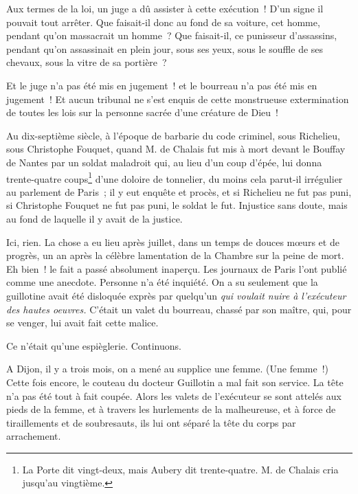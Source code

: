 \documentclass[french,twoside]{book} %
\begin{document}
Aux termes de la loi, un juge a dû assister à cette  exécution ! D’un signe il pouvait tout arrêter. Que faisait-il donc au fond de sa voiture, cet homme, pendant qu’on massacrait un homme ? Que faisait-il, ce punisseur d’assassins, pendant qu’on assassinait en plein jour, sous ses yeux, sous le souffle de ses chevaux, sous la vitre de sa portière ?\par
Et le juge n’a pas été mis en jugement ! et le bourreau n’a pas été mis en jugement ! Et aucun tribunal ne s’est enquis de cette monstrueuse extermination de toutes les lois sur la personne sacrée d’une créature de Dieu !\par
Au dix-septième siècle, à l’époque de barbarie du code criminel, sous Richelieu, sous Christophe Fouquet, quand M. de Chalais fut mis à mort devant le Bouffay de Nantes par un soldat maladroit qui, au lieu d’un coup d’épée, lui donna trente-quatre coups\footnote{ \noindent La Porte dit vingt-deux, mais Aubery dit trente-quatre. M. de Chalais cria jusqu’au vingtième.
 } d’une doloire de tonnelier, du moins cela parut-il irrégulier au parlement de Paris ; il y eut enquête et procès, et si Richelieu ne fut pas puni, si Christophe Fouquet ne fut pas puni, le soldat le fut. Injustice sans doute, mais au fond de laquelle il y avait de la justice.\par
Ici, rien. La chose a eu lieu après juillet, dans un temps de douces mœurs et de progrès, un an après la célèbre lamentation de la Chambre sur la peine de mort. Eh bien ! le fait a passé absolument inaperçu. Les journaux de Paris l’ont publié comme une anecdote. Personne n’a été inquiété. On a su seulement que la guillotine avait été disloquée exprès par quelqu’un \emph{qui voulait nuire à l’exécuteur  des hautes oeuvres.} C’était un valet du bourreau, chassé par son maître, qui, pour se venger, lui avait fait cette malice.\par
Ce n’était qu’une espièglerie. Continuons.\par
A Dijon, il y a trois mois, on a mené au supplice une femme. (Une femme !) Cette fois encore, le couteau du docteur Guillotin a mal fait son service. La tête n’a pas été tout à fait coupée. Alors les valets de l’exécuteur se sont attelés aux pieds de la femme, et à travers les hurlements de la malheureuse, et à force de tiraillements et de soubresauts, ils lui ont séparé la tête du corps par arrachement.\par
\end{document}
